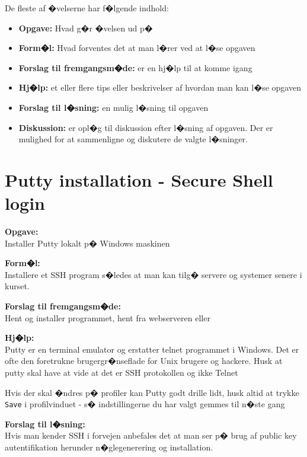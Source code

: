 \documentclass[a4paper,11pt,notitlepage]{oevelser}
\begin{document}
De fleste af �velserne har f�lgende indhold:
\begin{itemize}
\item {\bfseries Opgave:} Hvad g�r �velsen ud p�
\item {\bfseries Form�l:} Hvad forventes det at man l�rer ved at l�se opgaven
\item {\bfseries Forslag til fremgangsm�de:} er en hj�lp til at komme igang
\item {\bfseries Hj�lp:} et eller flere tips eller beskrivelser af hvordan
  man kan l�se opgaven
\item {\bfseries Forslag til l�sning:} en mulig l�sning til opgaven
\item {\bfseries Diskussion:} er opl�g til diskussion efter l�sning af
  opgaven. Der er mulighed for at sammenligne og diskutere de valgte
  l�sninger.
\end{itemize}


\chapter{Putty installation - Secure Shell login}
\label{ex:putty-install}

{\bfseries Opgave:}\\
Installer Putty lokalt p� Windows maskinen

{\bfseries Form�l:}\\
Installere et SSH program s�ledes at man kan tilg� servere og systemer senere i kurset.

{\bfseries Forslag til fremgangsm�de:}\\
Hent og installer programmet, hent fra webserveren eller\\


{\bfseries Hj�lp:}\\
Putty er en terminal emulator og erstatter telnet programmet i
Windows. Det er ofte den foretrukne brugergr�nseflade for Unix brugere
og hackere. Husk at putty skal have at vide at det er SSH protokollen og ikke
Telnet

Hvis der skal �ndres p� profiler kan Putty godt drille lidt, husk
altid at trykke \verb+Save+ i profilvinduet - s� indstillingerne du har
valgt gemmes til n�ste gang

{\bfseries Forslag til l�sning:}\\
Hvis man kender SSH i forvejen anbefales det at man ser p�
brug af public key autentifikation herunder n�glegenerering og
installation.
\end{document}

